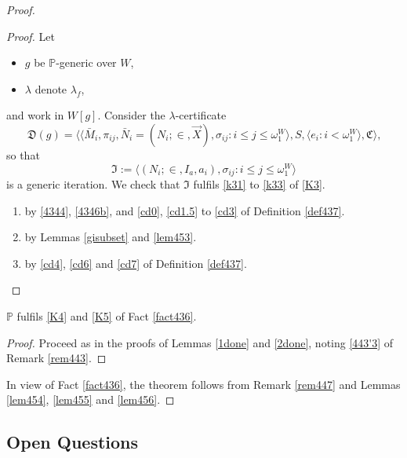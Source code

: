 \documentclass[12pt]{article}
\numberwithin{equation}{section}
\begin{document}
\begin{proof}
\begin{proof}
Let 
\begin{itemize}
    \item $g$ be $\mathbb{P}$-generic over $W$,
    \item $\lambda$ denote $\lambda_f$, 
\end{itemize} 
and work in $W[g]$. Consider the $\lambda$-certificate
\begin{equation*}
    \mathfrak{D}(g) = \langle \langle \bar{M}_i, \pi_{ij},  \bar{N}_i = (N_i; \in, \Vec{X}), \sigma_{ij} : i \leq j \leq \omega_1^{W} \rangle, S, \langle e_i : i < \omega_1^W \rangle, \mathfrak{C} \rangle \text{,}
\end{equation*}
so that 
\begin{equation*}
    \mathfrak{I} := \langle (N_i; \in, I_a, a_i), \sigma_{ij} : i \leq j \leq \omega_1^{W} \rangle
\end{equation*}
is a generic iteration. We check that $\mathfrak{I}$ fulfils \ref{k31} to \ref{k33} of \ref{K3}.
\begin{enumerate}[label=That \ref{k3\arabic*} holds:, leftmargin=100pt]
    \item by \ref{4344}, \ref{4346b}, and \ref{cd0}, \ref{cd1.5} to \ref{cd3} of Definition \ref{def437}.
    \item by Lemmas \ref{gisubset} and \ref{lem453}.
    \item by \ref{cd4}, \ref{cd6} and \ref{cd7} of Definition \ref{def437}. \qedhere
\end{enumerate}
\end{proof}

\begin{lem}\label{lem456}
$\mathbb{P}$ fulfils \ref{K4} and \ref{K5} of Fact \ref{fact436}.
\end{lem}

\begin{proof}
Proceed as in the proofs of Lemmas \ref{1done} and \ref{2done}, noting \ref{443'3} of Remark \ref{rem443}.
\end{proof}

In view of Fact \ref{fact436}, the theorem follows from Remark \ref{rem447} and Lemmas \ref{lem454}, \ref{lem455} and \ref{lem456}.
\end{proof}

\subsection{Open Questions}
\end{document}
